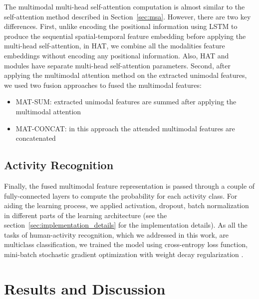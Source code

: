 \documentclass[runningheads]{llncs}
\newcommand{\hattn}{HAT}
\begin{document}
The multimodal multi-head self-attention computation is almost similar to the self-attention method described in Section~\ref{sec:msa}. However, there are two key differences. First, unlike encoding the positional information using LSTM to produce the sequential spatial-temporal feature embedding before applying the multi-head self-attention, in {\hattn}, we combine all the modalities feature embeddings without encoding any positional information. Also, {\hattn } and {\uat } modules have separate multi-head self-attention parameters. Second, after applying the multimodal attention method on the extracted unimodal features, we used two fusion approaches to fused the multimodal features:


\begin{itemize}
    \item MAT-SUM: extracted unimodal features are summed after applying the multimodal attention
    
    \item MAT-CONCAT: in this approach the attended multimodal features are concatenated
    
\end{itemize}

\subsection{Activity Recognition}
Finally, the fused multimodal feature representation  is passed through a couple of fully-connected layers to compute the probability for each activity class. For aiding the learning process, we applied activation, dropout, batch normalization in different parts of the learning architecture (see the section~\ref{sec:implementation_details} for the implementation details).
As all the tasks of human-activity recognition, which we addressed in this work, are multiclass classification, we trained the model using cross-entropy loss function, mini-batch stochastic gradient optimization with weight decay regularization \cite{adamw}.
 \section{Results and Discussion}
\label{sec:results_and_discussion}
\end{document}
